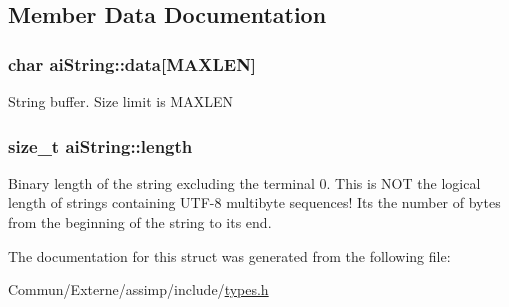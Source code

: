 \subsection{Member Data Documentation}
\subsubsection[{\texorpdfstring{data}{data}}]{\setlength{\rightskip}{0pt plus 5cm}char ai\+String\+::data\mbox{[}{\bf M\+A\+X\+L\+EN}\mbox{]}}\hypertarget{structai_string_aa90b1da7d347a3dcca0a95061e6ea41d}{}\label{structai_string_aa90b1da7d347a3dcca0a95061e6ea41d}
String buffer. Size limit is M\+A\+X\+L\+EN 
\subsubsection[{\texorpdfstring{length}{length}}]{\setlength{\rightskip}{0pt plus 5cm}size\+\_\+t ai\+String\+::length}\hypertarget{structai_string_a7d77c2031ff0340746aa046f7fbcf313}{}\label{structai_string_a7d77c2031ff0340746aa046f7fbcf313}
Binary length of the string excluding the terminal 0. This is N\+OT the logical length of strings containing U\+T\+F-\/8 multibyte sequences! It\textquotesingle{}s the number of bytes from the beginning of the string to its end. 

The documentation for this struct was generated from the following file\+:\begin{DoxyCompactItemize}
\item 
Commun/\+Externe/assimp/include/\hyperlink{types_8h}{types.\+h}\end{DoxyCompactItemize}
